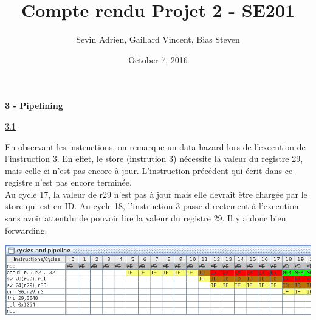 \documentclass[a4paper,12pt]{article}
\begin{document}
	\title{\textbf{Compte rendu Projet 2 - SE201}}
	\date{October 7, 2016}
	\author{Sevin Adrien, Gaillard Vincent, Bias Steven}
	\maketitle

	\Large{\textbf{3 - Pipelining}}\\\break
	\small

	\underline{3.1}\\
		\setlength{\parindent}{5ex}\par
		En observant les instructions, on remarque un data hazard lors de l'execution de l'instruction 3.
		En effet, le store (instrution 3) nécessite la valeur du registre 29, mais celle-ci n'est pas encore à jour.
		L'instruction précédent qui écrit dans ce registre n'est pas encore terminée.\\
		Au cycle 17, la valeur de r29 n'est pas à jour mais elle devrait être chargée par le store qui est en ID.
		Au cycle 18, l'instruction 3 passe directement à l'execution sans avoir attentdu de pouvoir lire la valeur du registre 29.
		Il y a donc bien forwarding.
		\begin{center}
			\includegraphics[width=\linewidth]{img/1}
		\end{center}
\end{document}
